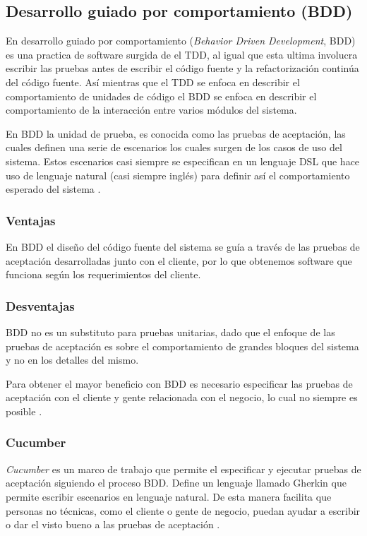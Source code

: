 \subsection{Desarrollo guiado por comportamiento (BDD)}
En desarrollo guiado por comportamiento (\textit{Behavior Driven Development}, BDD)
es una practica de software surgida de el TDD, al igual que esta ultima
involucra escribir las pruebas antes de escribir el código fuente y la
refactorización continúa del código fuente. Así mientras que el TDD se enfoca
en describir el comportamiento de unidades de código el BDD se enfoca en
describir el comportamiento de la interacción entre varios módulos del sistema.

En BDD la unidad de prueba, es conocida como las pruebas de aceptación, las cuales
definen una serie de escenarios los cuales surgen de los casos de uso del sistema.
Estos escenarios casi siempre se especifican en un lenguaje DSL que hace uso
de lenguaje natural (casi siempre inglés) para definir así el comportamiento
esperado del sistema \cite{23_chelimsky_2010}.

\subsubsection{Ventajas}
En BDD el diseño del código fuente del sistema se guía a través de las pruebas
de aceptación desarrolladas junto con el cliente, por lo que obtenemos software
que funciona según los requerimientos del cliente.

\subsubsection{Desventajas}
BDD no es un substituto para pruebas unitarias, dado que el enfoque de
las pruebas de aceptación es sobre el comportamiento de grandes bloques
del sistema y no en los detalles del mismo.

Para obtener el mayor beneficio con BDD es necesario especificar las pruebas
de aceptación con el cliente y gente relacionada con el negocio, lo cual no
siempre es posible \cite{12_rappin_2010}.

\subsubsection{Cucumber}
\textit{Cucumber} es un marco de trabajo que permite el especificar y ejecutar
pruebas de aceptación siguiendo el proceso BDD. Define un lenguaje llamado
Gherkin que permite escribir escenarios en lenguaje natural. De esta manera
facilita que personas no técnicas, como el cliente o gente de negocio,
puedan ayudar a escribir o dar el visto bueno a las pruebas de aceptación
\cite{23_chelimsky_2010}.

